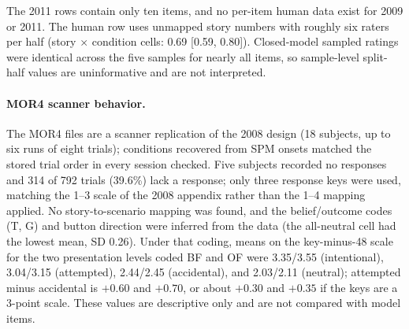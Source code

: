 \begin{table}[h]
\centering
\footnotesize
\caption{Spearman--Brown split-half reliability (median over 1{,}000 random splits; brackets are the 2.5--97.5\% split range). ``Within'' removes condition means first; model raters were z-scored within model $\times$ template $\times$ source.}
\label{tab:reliability}
\end{table}

The 2011 rows contain only ten items, and no per-item human data exist for 2009 or 2011.
The human row uses unmapped story numbers with roughly six raters per half (story $\times$ condition cells: 0.69 [0.59, 0.80]).
Closed-model sampled ratings were identical across the five samples for nearly all items, so sample-level split-half values are uninformative and are not interpreted.

\paragraph{MOR4 scanner behavior.}
The MOR4 files are a scanner replication of the 2008 design (18 subjects, up to six runs of eight trials); conditions recovered from SPM onsets matched the stored trial order in every session checked.
Five subjects recorded no responses and 314 of 792 trials (39.6\%) lack a response; only three response keys were used, matching the 1--3 scale of the 2008 appendix rather than the 1--4 mapping applied.
No story-to-scenario mapping was found, and the belief/outcome codes (T, G) and button direction were inferred from the data (the all-neutral cell had the lowest mean, SD 0.26).
Under that coding, means on the key-minus-48 scale for the two presentation levels coded BF and OF were 3.35/3.55 (intentional), 3.04/3.15 (attempted), 2.44/2.45 (accidental), and 2.03/2.11 (neutral); attempted minus accidental is $+0.60$ and $+0.70$, or about $+0.30$ and $+0.35$ if the keys are a 3-point scale.
These values are descriptive only and are not compared with model items.

